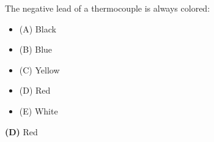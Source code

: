 

The negative lead of a thermocouple is always colored:

\begin{itemize}
\item{(A)} Black
\vskip 5pt 
\item{(B)} Blue
\vskip 5pt 
\item{(C)} Yellow
\vskip 5pt 
\item{(D)} Red
\vskip 5pt 
\item{(E)} White
\end{itemize}







{\bf (D)} Red
 









